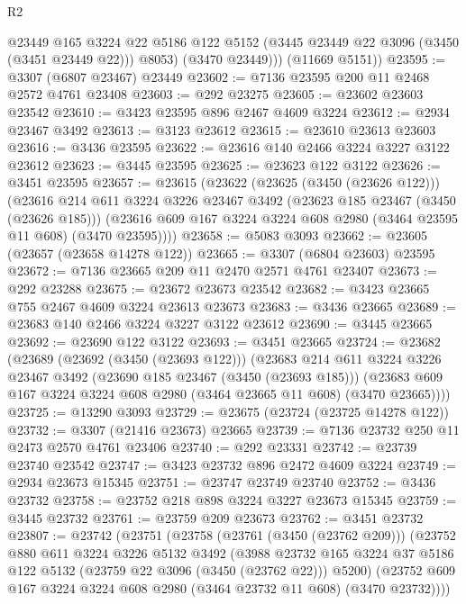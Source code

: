 \begin{lexlean}{R2}
\begin{coremodule}
            @23449
            @165
            @3224
            @22
            @5186
            @122
            @5152
            (@3445 @23449 @22 @3096 (@3450 (@3451 @23449 @22)))
            @8053)
          (@3470 @23449)))
      (@11669 @5151))
@23595 := @3307 (@6807 @23467) @23449
@23602 := @7136 @23595 @200 @11 @2468 @2572 @4761 @23408
@23603 := @292 @23275
@23605 := @23602 @23603 @23542
@23610 := @3423 @23595 @896 @2467 @4609 @3224
@23612 := @2934 @23467 @3492
@23613 := @3123 @23612
@23615 := @23610 @23613 @23603
@23616 := @3436 @23595
@23622 := @23616 @140 @2466 @3224 @3227 @3122 @23612
@23623 := @3445 @23595
@23625 := @23623 @122 @3122
@23626 := @3451 @23595
@23657 := @23615
    (@23622
      (@23625 (@3450 (@23626 @122)))
      (@23616
        @214
        @611
        @3224
        @3226
        @23467
        @3492
        (@23623 @185 @23467 (@3450 (@23626 @185)))
        (@23616 @609 @167 @3224 @3224 @608 @2980 (@3464 @23595 @11 @608) (@3470 @23595))))
@23658 := @5083 @3093
@23662 := @23605 (@23657 (@23658 @14278 @122))
@23665 := @3307 (@6804 @23603) @23595
@23672 := @7136 @23665 @209 @11 @2470 @2571 @4761 @23407
@23673 := @292 @23288
@23675 := @23672 @23673 @23542
@23682 := @3423 @23665 @755 @2467 @4609 @3224 @23613 @23673
@23683 := @3436 @23665
@23689 := @23683 @140 @2466 @3224 @3227 @3122 @23612
@23690 := @3445 @23665
@23692 := @23690 @122 @3122
@23693 := @3451 @23665
@23724 := @23682
    (@23689
      (@23692 (@3450 (@23693 @122)))
      (@23683
        @214
        @611
        @3224
        @3226
        @23467
        @3492
        (@23690 @185 @23467 (@3450 (@23693 @185)))
        (@23683 @609 @167 @3224 @3224 @608 @2980 (@3464 @23665 @11 @608) (@3470 @23665))))
@23725 := @13290 @3093
@23729 := @23675 (@23724 (@23725 @14278 @122))
@23732 := @3307 (@21416 @23673) @23665
@23739 := @7136 @23732 @250 @11 @2473 @2570 @4761 @23406
@23740 := @292 @23331
@23742 := @23739 @23740 @23542
@23747 := @3423 @23732 @896 @2472 @4609 @3224
@23749 := @2934 @23673 @15345
@23751 := @23747 @23749 @23740
@23752 := @3436 @23732
@23758 := @23752 @218 @898 @3224 @3227 @23673 @15345
@23759 := @3445 @23732
@23761 := @23759 @209 @23673
@23762 := @3451 @23732
@23807 := @23742
    (@23751
      (@23758
        (@23761 (@3450 (@23762 @209)))
        (@23752
          @880
          @611
          @3224
          @3226
          @5132
          @3492
          (@3988
            @23732
            @165
            @3224
            @37
            @5186
            @122
            @5132
            (@23759 @22 @3096 (@3450 (@23762 @22)))
            @5200)
          (@23752 @609 @167 @3224 @3224 @608 @2980 (@3464 @23732 @11 @608) (@3470 @23732))))

\end{coremodule}
\end{lexlean}
